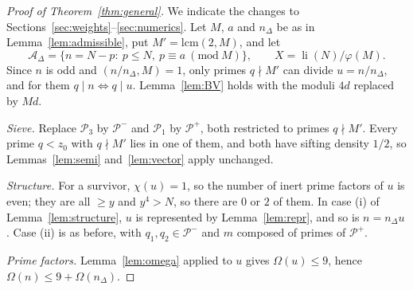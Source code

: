 \documentclass[11pt]{amsart}
\theoremstyle{remark}
\newcommand{\cA}{\mathcal{A}}
\newcommand{\cP}{\mathcal{P}}
\newcommand{\li}{\operatorname{li}}
\begin{document}
\begin{proof}[Proof of Theorem~\ref{thm:general}]
We indicate the changes to Sections~\ref{sec:weights}--\ref{sec:numerics}. Let $M$, $a$ and $n_\Delta$
be as in Lemma~\ref{lem:admissible}, put $M'=\mathrm{lcm}(2,M)$, and let
\[
\cA_\Delta=\{n=N-p:\ p\le N,\ p\equiv a\ (\mathrm{mod}\ M)\},\qquad X=\li(N)/\varphi(M).
\]
Since $n$ is odd and $(n/n_\Delta,M)=1$, only primes $q\nmid M'$ can divide $u=n/n_\Delta$, and for them
$q\mid n\Leftrightarrow q\mid u$. Lemma~\ref{lem:BV} holds with the moduli $4d$ replaced by $Md$.

\emph{Sieve.} Replace $\cP_3$ by $\cP^-$ and $\cP_1$ by $\cP^+$, both restricted to primes $q\nmid M'$.
Every prime $q<z_0$ with $q\nmid M'$ lies in one of them, and both have sifting density $1/2$, so
Lemmas~\ref{lem:semi} and~\ref{lem:vector} apply unchanged.

\emph{Structure.} For a survivor, $\chi(u)=1$, so the number of inert prime factors of $u$ is even; they
are all $\ge y$ and $y^4>N$, so there are $0$ or $2$ of them. In case (i) of Lemma~\ref{lem:structure}, $u$
is represented by Lemma~\ref{lem:repr}, and so is $n=n_\Delta u$. Case (ii) is as before, with
$q_1,q_2\in\cP^-$ and $m$ composed of primes of $\cP^+$.

\emph{Prime factors.} Lemma~\ref{lem:omega} applied to $u$ gives $\Omega(u)\le 9$, hence
$\Omega(n)\le 9+\Omega(n_\Delta)$.


\end{proof}
\end{document}
